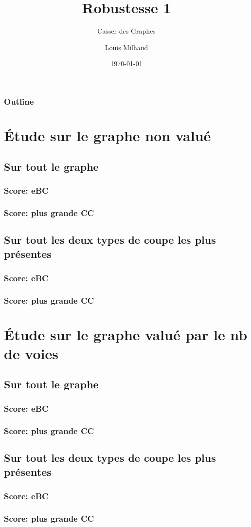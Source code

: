 \documentclass[aspectratio=169]{beamer}
\title{Robustesse 1}
\subtitle{Casser des Graphes}
\author{Louis Milhaud}
\institute{Complex Networks - LIP6}
\date{\today}
\begin{document}
    \begin{frame}
        \titlepage
    \end{frame}

    \begin{frame}
        \frametitle{Outline}
        \tableofcontents
    \end{frame}

    \section{Étude sur le graphe non valué}
    \subsection{Sur tout le graphe}
    \begin{frame}
        \frametitle{Score: eBC}
    \end{frame}
    \begin{frame}
        \frametitle{Score: plus grande CC}
    \end{frame}
    
    \subsection{Sur tout les deux types de coupe les plus présentes}
    \begin{frame}
        \frametitle{Score: eBC}
    \end{frame}
    \begin{frame}
        \frametitle{Score: plus grande CC}
    \end{frame}

    \section{Étude sur le graphe valué par le nb de voies}
    \subsection{Sur tout le graphe}
    \begin{frame}
        \frametitle{Score: eBC}
    \end{frame}
    \begin{frame}
        \frametitle{Score: plus grande CC}
    \end{frame}

    \subsection{Sur tout les deux types de coupe les plus présentes}
    \begin{frame}
        \frametitle{Score: eBC}
    \end{frame}
    \begin{frame}
        \frametitle{Score: plus grande CC}
    \end{frame}
\end{document}
